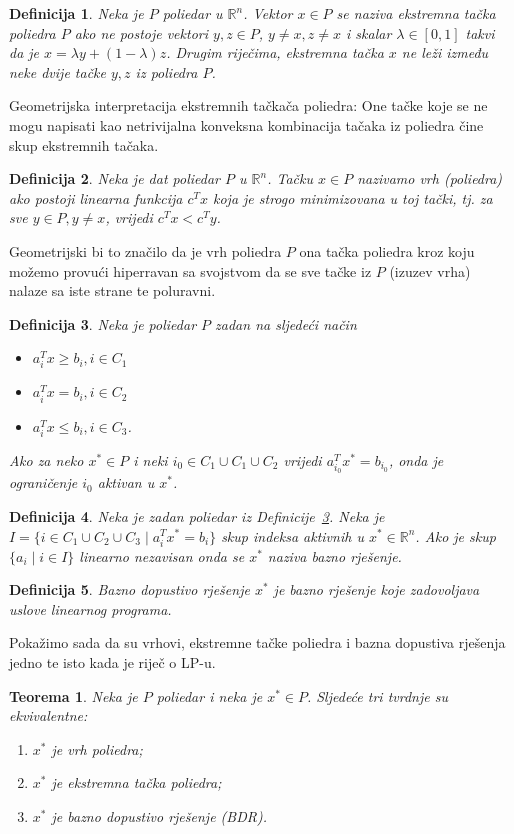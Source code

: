 \documentclass[a4paper, utf8, 11pt, colorlinks]{book}
\newtheorem{definition}{Definicija}
\newtheorem{thm}{Teorema}
\begin{document}
\begin{definition}
   Neka je $P$ poliedar u $\mathbb{R}^n$.  Vektor $x \in P$ se naziva ekstremna tačka poliedra $P$
   ako ne postoje vektori $y, z \in P$, $y \neq x, z \neq x$ i skalar $\lambda \in [0, 1]$ takvi da je  $x = \lambda y + (1-\lambda)z$. Drugim riječima, ekstremna tačka $x$ ne leži između neke dvije tačke $y,z$ iz poliedra $P$.
\end{definition}
Geometrijska interpretacija ekstremnih tačkača poliedra:  One tačke koje se ne mogu napisati kao netrivijalna konveksna kombinacija tačaka iz poliedra čine skup ekstremnih tačaka. 
 
\begin{definition}
   Neka je dat poliedar $P$ u $\mathbb{R}^n$. Tačku $x \in P$ nazivamo vrh (poliedra) ako postoji linearna funkcija  $c^T x$ koja je strogo minimizovana u toj tački, tj. za sve  $y\in P, y \neq x$, vrijedi $c^T x < c^T y$. 
\end{definition}
Geometrijski bi to značilo da je vrh poliedra $P$ ona tačka poliedra  kroz koju možemo provući hiperravan sa svojstvom da se sve tačke iz $P$ (izuzev vrha) nalaze sa iste strane te poluravni.

\begin{definition}\label{dfn:lp_aktivan}
   Neka je poliedar $P$ zadan na sljedeći način
   \begin{itemize}
       \item $a_i^T x \geq b_i, i \in C_1$
       \item $a_i^T x = b_i, i \in C_2 $
       \item $a_i^T x \leq b_i, i \in C_3 $. 
   \end{itemize}
   Ako za neko $x^* \in P$ i neki $i_0 \in C_1 \cup C_1 \cup C_2$ vrijedi 
   $a_{i_0}^T x^* = b_{i_0}$, onda je ograničenje $i_0$ aktivan u $x^*$. 
\end{definition}

\begin{definition}
      Neka je zadan poliedar iz Definicije~\ref{dfn:lp_aktivan}. Neka je 
      $I = \{ i \in C_1 \cup C_2 \cup C_3 \mid a_i^T x^* = b_i \}$  skup indeksa aktivnih u $x^*\in \mathbb{R}^n$.  Ako je skup $\{ a_i \mid i \in I \}$ linearno nezavisan onda se $x^*$  naziva bazno rješenje. 
\end{definition}
\begin{definition}
	 Bazno dopustivo rješenje $x^*$ je bazno rješenje koje zadovoljava  uslove linearnog programa. 
\end{definition}
Pokažimo sada da su vrhovi, ekstremne tačke poliedra i bazna dopustiva rješenja jedno te isto kada je riječ o LP-u.
\begin{thm}
   Neka je $P$ poliedar i neka je $x^* \in P$. Sljedeće tri tvrdnje su ekvivalentne:
   \begin{enumerate}
       \item $x^*$ je vrh poliedra;
       \item $x^*$ je ekstremna tačka poliedra;
       \item $x^*$ je bazno dopustivo rješenje (BDR).
   \end{enumerate}
\end{thm}
\end{document}
